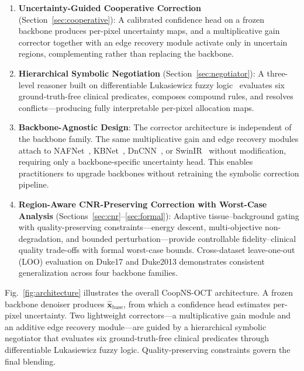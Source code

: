 \documentclass[journal,twoside,web]{ieeecolor}
\begin{document}
\begin{enumerate}[nosep, leftmargin=*]
\item \textbf{Uncertainty-Guided Cooperative Correction} (Section~\ref{sec:cooperative}): A calibrated confidence head on a frozen backbone produces per-pixel uncertainty maps, and a multiplicative gain corrector together with an edge recovery module activate only in uncertain regions, complementing rather than replacing the backbone.

\item \textbf{Hierarchical Symbolic Negotiation} (Section~\ref{sec:negotiator}): A three-level reasoner built on differentiable Lukasiewicz fuzzy logic~\cite{vankrieken2022analyzing} evaluates six ground-truth-free clinical predicates, composes compound rules, and resolves conflicts---producing fully interpretable per-pixel allocation maps.

\item \textbf{Backbone-Agnostic Design}: The corrector architecture is independent of the backbone family. The same multiplicative gain and edge recovery modules attach to NAFNet~\cite{chen2022simple}, KBNet~\cite{zhang2023kbnet}, DnCNN~\cite{zhang2017beyond}, or SwinIR~\cite{liang2021swinir} without modification, requiring only a backbone-specific uncertainty head. This enables practitioners to upgrade backbones without retraining the symbolic correction pipeline.

\item \textbf{Region-Aware CNR-Preserving Correction with Worst-Case Analysis} (Sections~\ref{sec:cnr}--\ref{sec:formal}): Adaptive tissue--background gating with quality-preserving constraints---energy descent, multi-objective non-degradation, and bounded perturbation---provide controllable fidelity--clinical quality trade-offs with formal worst-case bounds. Cross-dataset leave-one-out (LOO) evaluation on Duke17 and Duke2013 demonstrates consistent generalization across four backbone families.
\end{enumerate}

Fig.~\ref{fig:architecture} illustrates the overall CoopNS-OCT architecture. A frozen backbone denoiser produces $\hat{\mathbf{x}}_\text{base}$, from which a confidence head estimates per-pixel uncertainty. Two lightweight correctors---a multiplicative gain module and an additive edge recovery module---are guided by a hierarchical symbolic negotiator that evaluates six ground-truth-free clinical predicates through differentiable Lukasiewicz fuzzy logic. Quality-preserving constraints govern the final blending.
\end{document}
